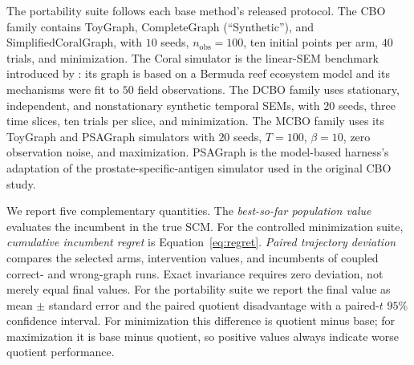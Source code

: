 \documentclass[twoside]{article}
\begin{document}
The portability suite follows each base method's released protocol. The CBO
family contains ToyGraph, CompleteGraph (``Synthetic''), and
SimplifiedCoralGraph, with $10$ seeds, $n_{\mathrm{obs}}=100$, ten initial
points per arm, $40$ trials, and minimization. The Coral simulator is the
linear-SEM benchmark introduced by \citet{agliettiCausalBayesianOptimization2020b}:
its graph is based on a Bermuda reef ecosystem model and its mechanisms were
fit to $50$ field observations. The DCBO family uses stationary, independent,
and nonstationary synthetic temporal SEMs, with $20$ seeds, three time slices,
ten trials per slice, and minimization. The MCBO family uses its ToyGraph and
PSAGraph simulators with $20$ seeds, $T=100$, $\beta=10$, zero observation
noise, and maximization. PSAGraph is the model-based harness's adaptation of
the prostate-specific-antigen simulator used in the original CBO study.

We report five complementary quantities. The \emph{best-so-far population
value} evaluates the incumbent in the true SCM. For the controlled
minimization suite, \emph{cumulative incumbent regret} is Equation~\eqref{eq:regret}.
\emph{Paired trajectory deviation} compares the selected arms, intervention
values, and incumbents of coupled correct- and wrong-graph runs. Exact
invariance requires zero deviation, not merely equal final values. For the
portability suite we report the final value as mean $\pm$ standard error and
the paired quotient disadvantage with a paired-$t$ $95\%$ confidence
interval. For minimization this difference is quotient minus base; for
maximization it is base minus quotient, so positive values always indicate
worse quotient performance.

\begin{table}[t]
\centering
\caption{Evaluation map. Arrows give the objective direction.}
\label{tab:experiment-map}
\small
{}
\end{table}
\end{document}
